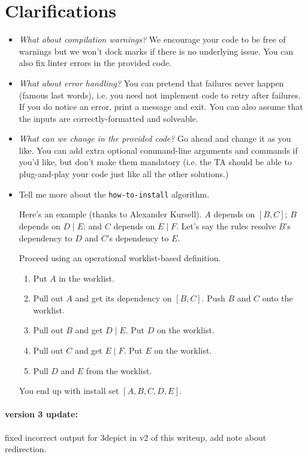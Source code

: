 \documentclass[12pt]{article}
\renewcommand{\_}{\kern-1.5pt\textunderscore\kern-1.5pt}
\begin{document}
\section*{Clarifications}
\begin{itemize}
\item \emph{What about compilation warnings?} We encourage your code to be free of warnings but we won't dock marks if there is no underlying issue. You can also fix linter errors in the provided code.
\item \emph{What about error handling?} You can pretend that failures never happen (famous last words), i.e. you need not implement code to retry after failures. If you do notice an error, print a message and exit. You can also assume that the inputs are correctly-formatted and solveable.
  \item \emph{What can we change in the provided code?} Go ahead and change it as you like. You can add extra optional command-line arguments and commands if you'd like, but don't make them mandatory (i.e. the TA should be able to plug-and-play your code just like all the other solutions.) 
\item Tell me more about the \texttt{how-to-install} algorithm.

\vspace{1em} Here's an example (thanks to Alexander Kursell). $A$ depends on $[B, C]$; $B$ depends on $D \mid E$; and $C$ depends on $E \mid F$. Let's say the rules resolve $B$'s dependency to $D$ and $C$'s dependency to $E$.

\vspace{1em} Proceed using an operational worklist-based definition. 
\begin{enumerate}[noitemsep]
\item Put $A$ in the worklist.
\item Pull out $A$ and get its dependency on $[B, C]$. Push $B$ and $C$ onto the worklist.
\item Pull out $B$ and get $D \mid E$. Put $D$ on the worklist.
\item Pull out $C$ and get $E \mid F$. Put $E$ on the worklist.
\item Pull $D$ and $E$ from the worklist.
\end{enumerate}
You end up with install set $[A, B, C, D, E]$.
\end{itemize}

\paragraph{version 3 update:} fixed incorrect output for 3depict in v2 of this writeup, add note about redirection.
\end{document}
